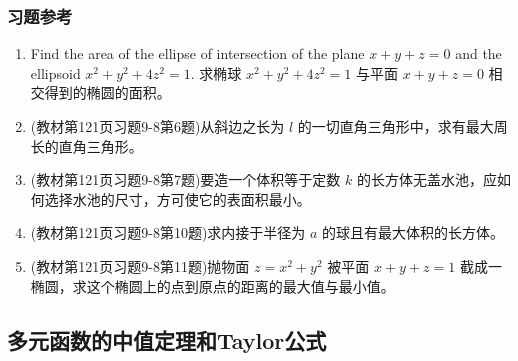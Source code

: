 \subsubsection{习题参考}
\begin{enumerate}
    \item Find the area of the ellipse of intersection of the plane $x+y+z=0$ and the ellipsoid $x^2 + y^2 + 4z^2=1$. 求椭球 $x^2 + y^2 + 4z^2=1$ 与平面 $x+y+z=0$ 相交得到的椭圆的面积。

    \item (教材第121页习题9-8第6题)从斜边之长为 $l$ 的一切直角三角形中，求有最大周长的直角三角形。

    \item (教材第121页习题9-8第7题)要造一个体积等于定数 $k$ 的长方体无盖水池，应如何选择水池的尺寸，方可使它的表面积最小。

    \item (教材第121页习题9-8第10题)求内接于半径为 $a$ 的球且有最大体积的长方体。

    \item (教材第121页习题9-8第11题)抛物面 $z=x^2+y^2$ 被平面 $x+y+z=1$ 截成一椭圆，求这个椭圆上的点到原点的距离的最大值与最小值。
\end{enumerate}

\subsection{多元函数的中值定理和Taylor公式}

